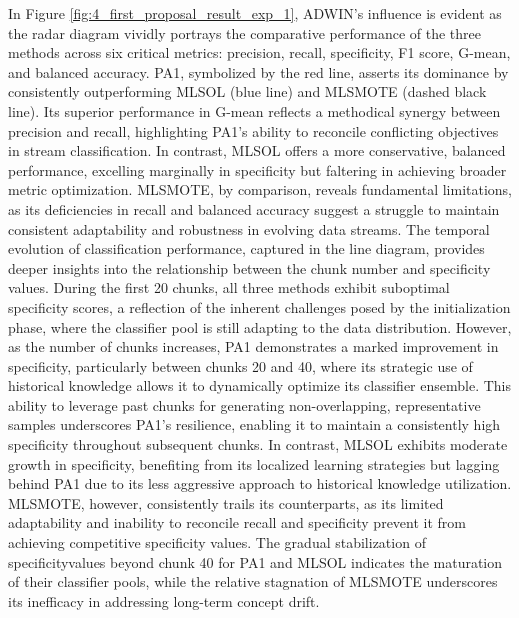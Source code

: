 In Figure \ref{fig:4_first_proposal_result_exp_1}, ADWIN’s influence is evident as the radar diagram vividly portrays the comparative performance of the three methods across six critical metrics: precision, recall, specificity, F1 score, G-mean, and balanced accuracy. PA1, symbolized by the red line, asserts its dominance by consistently outperforming MLSOL (blue line) and MLSMOTE (dashed black line). Its superior performance in G-mean reflects a methodical synergy between precision and recall, highlighting PA1’s ability to reconcile conflicting objectives in stream classification. In contrast, MLSOL offers a more conservative, balanced performance, excelling marginally in specificity but faltering in achieving broader metric optimization. MLSMOTE, by comparison, reveals fundamental limitations, as its deficiencies in recall and balanced accuracy suggest a struggle to maintain consistent adaptability and robustness in evolving data streams. The temporal evolution of classification performance, captured in the line diagram, provides deeper insights into the relationship between the chunk number and specificity values. During the first 20 chunks, all three methods exhibit suboptimal specificity scores, a reflection of the inherent challenges posed by the initialization phase, where the classifier pool is still adapting to the data distribution. However, as the number of chunks increases, PA1 demonstrates a marked improvement in specificity, particularly between chunks 20 and 40, where its strategic use of historical knowledge allows it to dynamically optimize its classifier ensemble. This ability to leverage past chunks for generating non-overlapping, representative samples underscores PA1’s resilience, enabling it to maintain a consistently high specificity throughout subsequent chunks. In contrast, MLSOL exhibits moderate growth in specificity, benefiting from its localized learning strategies but lagging behind PA1 due to its less aggressive approach to historical knowledge utilization. MLSMOTE, however, consistently trails its counterparts, as its limited adaptability and inability to reconcile recall and specificity prevent it from achieving competitive specificity values. The gradual stabilization of specificityvalues beyond chunk 40 for PA1 and MLSOL indicates the maturation of their classifier pools, while the relative stagnation of MLSMOTE underscores its inefficacy in addressing long-term concept drift.
